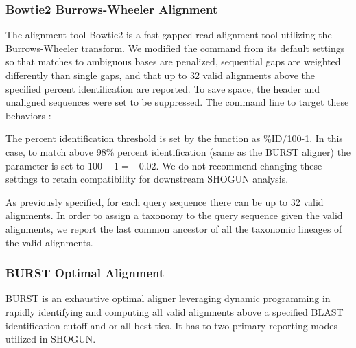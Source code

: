 \subsubsection{Bowtie2 Burrows-Wheeler Alignment}

The alignment tool Bowtie2 \cite{langmead_fast_2012} is a fast gapped read alignment tool utilizing the Burrows-Wheeler transform. We modified the  command from its default settings so that matches to ambiguous bases are penalized, sequential gaps are weighted differently than single gaps, and that up to 32 valid alignments above the specified percent identification are reported. To save space, the header and unaligned sequences were set to be suppressed. The command line to target these behaviors \cite{al-ghalith_ninja-ops:_2016}:

\begin{center}
\end{center}

The percent identification threshold is set by the  function  as \%ID/100-1. In this case, to match above 98\% percent identification (same as the BURST aligner) the parameter  is set to $100-1=-0.02$. We do not recommend changing these settings to retain compatibility for downstream SHOGUN analysis.

As previously specified, for each query sequence there can be up to 32 valid alignments. In order to assign a taxonomy to the query sequence given the valid alignments, we report the last common ancestor of all the taxonomic lineages of the valid alignments.

\subsubsection{BURST Optimal Alignment}

BURST is an exhaustive optimal aligner leveraging dynamic programming in rapidly identifying and computing all valid alignments above a specified BLAST identification cutoff and or all best ties. It has to two primary reporting modes utilized in SHOGUN.


